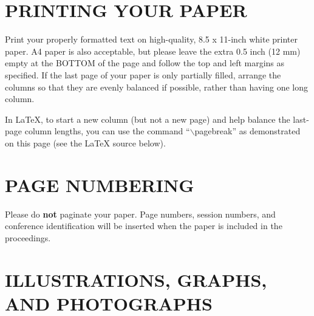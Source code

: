\documentclass{article}
\begin{document}
\section{PRINTING YOUR PAPER}
\label{sec:print}

Print your properly formatted text on high-quality, 8.5 x 11-inch white printer
paper. A4 paper is also acceptable, but please leave the extra 0.5 inch (12 mm)
empty at the BOTTOM of the page and follow the top and left margins as
specified.  If the last page of your paper is only partially filled, arrange
the columns so that they are evenly balanced if possible, rather than having
one long column.

In LaTeX, to start a new column (but not a new page) and help balance the
last-page column lengths, you can use the command ``$\backslash$pagebreak'' as
demonstrated on this page (see the LaTeX source below).

\section{PAGE NUMBERING}
\label{sec:page}

Please do {\bf not} paginate your paper.  Page numbers, session numbers, and
conference identification will be inserted when the paper is included in the
proceedings.

\section{ILLUSTRATIONS, GRAPHS, AND PHOTOGRAPHS}
\label{sec:illust}

\end{document}
